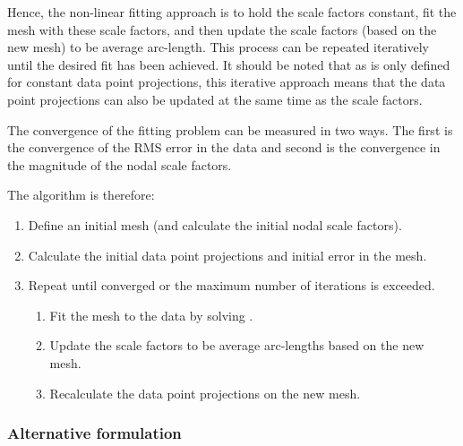 Hence, the non-linear fitting approach is to hold the scale factors constant, fit
the mesh with these scale factors, and then update the scale factors (based on
the new mesh) to be average arc-length. This process can be repeated iteratively
until the desired fit has been achieved. It should be noted that as
 is only defined for constant data point projections,
this iterative approach means that the data point projections can also be
updated at the same time as the scale factors.

The convergence of the fitting problem can be measured in two ways. The first
is the convergence of the RMS error in the data and second is the convergence
in the magnitude of the nodal scale factors.

The algorithm is therefore:
\begin{enumerate}
\item Define an initial mesh (and calculate the initial nodal scale factors).
  \item Calculate the initial data point projections and initial error in the
    mesh.
  \item Repeat until converged or the maximum number of iterations is exceeded.
  \begin{enumerate}
    \item Fit the mesh to the data by solving .
    \item Update the scale factors to be average arc-lengths based on the new
      mesh.
    \item Recalculate the data point projections on the new mesh.
  \end{enumerate}
\end{enumerate}

\subsubsection{Alternative formulation}
\label{sec:alternativeformulation}

